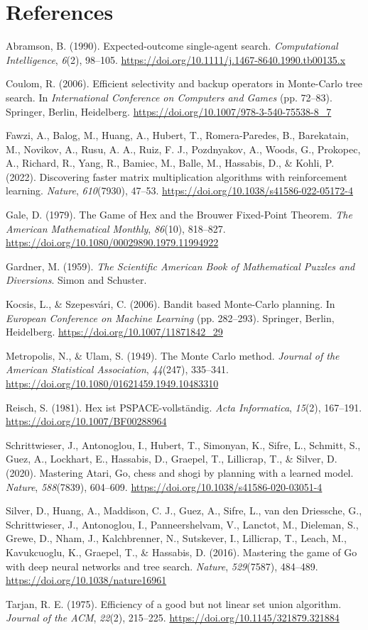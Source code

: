 \documentclass[12pt,a4paper]{article}
\begin{document}
\section*{References}

Abramson, B. (1990). Expected-outcome single-agent search. \textit{Computational Intelligence}, \textit{6}(2), 98--105. \url{https://doi.org/10.1111/j.1467-8640.1990.tb00135.x}

Coulom, R. (2006). Efficient selectivity and backup operators in Monte-Carlo tree search. In \textit{International Conference on Computers and Games} (pp. 72--83). Springer, Berlin, Heidelberg. \url{https://doi.org/10.1007/978-3-540-75538-8_7}

Fawzi, A., Balog, M., Huang, A., Hubert, T., Romera-Paredes, B., Barekatain, M., Novikov, A., Rusu, A. A., Ruiz, F. J., Pozdnyakov, A., Woods, G., Prokopec, A., Richard, R., Yang, R., Bamiec, M., Balle, M., Hassabis, D., \& Kohli, P. (2022). Discovering faster matrix multiplication algorithms with reinforcement learning. \textit{Nature}, \textit{610}(7930), 47--53. \url{https://doi.org/10.1038/s41586-022-05172-4}

Gale, D. (1979). The Game of Hex and the Brouwer Fixed-Point Theorem. \textit{The American Mathematical Monthly}, \textit{86}(10), 818--827. \url{https://doi.org/10.1080/00029890.1979.11994922}

Gardner, M. (1959). \textit{The Scientific American Book of Mathematical Puzzles and Diversions}. Simon and Schuster.

Kocsis, L., \& Szepesv\'ari, C. (2006). Bandit based Monte-Carlo planning. In \textit{European Conference on Machine Learning} (pp. 282--293). Springer, Berlin, Heidelberg. \url{https://doi.org/10.1007/11871842_29}

Metropolis, N., \& Ulam, S. (1949). The Monte Carlo method. \textit{Journal of the American Statistical Association}, \textit{44}(247), 335--341. \url{https://doi.org/10.1080/01621459.1949.10483310}

Reisch, S. (1981). Hex ist PSPACE-vollst\"andig. \textit{Acta Informatica}, \textit{15}(2), 167--191. \url{https://doi.org/10.1007/BF00288964}

Schrittwieser, J., Antonoglou, I., Hubert, T., Simonyan, K., Sifre, L., Schmitt, S., Guez, A., Lockhart, E., Hassabis, D., Graepel, T., Lillicrap, T., \& Silver, D. (2020). Mastering Atari, Go, chess and shogi by planning with a learned model. \textit{Nature}, \textit{588}(7839), 604--609. \url{https://doi.org/10.1038/s41586-020-03051-4}

Silver, D., Huang, A., Maddison, C. J., Guez, A., Sifre, L., van den Driessche, G., Schrittwieser, J., Antonoglou, I., Panneershelvam, V., Lanctot, M., Dieleman, S., Grewe, D., Nham, J., Kalchbrenner, N., Sutskever, I., Lillicrap, T., Leach, M., Kavukcuoglu, K., Graepel, T., \& Hassabis, D. (2016). Mastering the game of Go with deep neural networks and tree search. \textit{Nature}, \textit{529}(7587), 484--489. \url{https://doi.org/10.1038/nature16961}

Tarjan, R. E. (1975). Efficiency of a good but not linear set union algorithm. \textit{Journal of the ACM}, \textit{22}(2), 215--225. \url{https://doi.org/10.1145/321879.321884}
\end{document}

